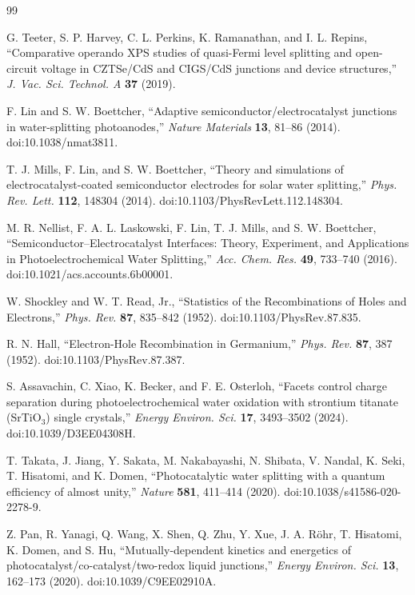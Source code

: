 \documentclass[11pt]{article}
\begin{document}
\clearpage
{}
{}
\begin{thebibliography}{99}

G. Teeter, S. P. Harvey, C. L. Perkins, K. Ramanathan, and I. L. Repins,
``Comparative operando XPS studies of quasi-Fermi level splitting and open-circuit voltage in CZTSe/CdS and CIGS/CdS junctions and device structures,''
\textit{J. Vac. Sci. Technol. A} \textbf{37} (2019).

F. Lin and S. W. Boettcher,
``Adaptive semiconductor/electrocatalyst junctions in water-splitting photoanodes,''
\textit{Nature Materials} \textbf{13}, 81--86 (2014). doi:10.1038/nmat3811.

T. J. Mills, F. Lin, and S. W. Boettcher,
``Theory and simulations of electrocatalyst-coated semiconductor electrodes for solar water splitting,''
\textit{Phys. Rev. Lett.} \textbf{112}, 148304 (2014). doi:10.1103/PhysRevLett.112.148304.

M. R. Nellist, F. A. L. Laskowski, F. Lin, T. J. Mills, and S. W. Boettcher,
``Semiconductor--Electrocatalyst Interfaces: Theory, Experiment, and Applications in Photoelectrochemical Water Splitting,''
\textit{Acc. Chem. Res.} \textbf{49}, 733--740 (2016). doi:10.1021/acs.accounts.6b00001.

W. Shockley and W. T. Read, Jr.,
``Statistics of the Recombinations of Holes and Electrons,''
\textit{Phys. Rev.} \textbf{87}, 835--842 (1952). doi:10.1103/PhysRev.87.835.

R. N. Hall,
``Electron-Hole Recombination in Germanium,''
\textit{Phys. Rev.} \textbf{87}, 387 (1952). doi:10.1103/PhysRev.87.387.

S. Assavachin, C. Xiao, K. Becker, and F. E. Osterloh,
``Facets control charge separation during photoelectrochemical water oxidation with strontium titanate (SrTiO$_3$) single crystals,''
\textit{Energy Environ. Sci.} \textbf{17}, 3493--3502 (2024). doi:10.1039/D3EE04308H.

T. Takata, J. Jiang, Y. Sakata, M. Nakabayashi, N. Shibata, V. Nandal, K. Seki, T. Hisatomi, and K. Domen,
``Photocatalytic water splitting with a quantum efficiency of almost unity,''
\textit{Nature} \textbf{581}, 411--414 (2020). doi:10.1038/s41586-020-2278-9.

Z. Pan, R. Yanagi, Q. Wang, X. Shen, Q. Zhu, Y. Xue, J. A. R\"ohr, T. Hisatomi, K. Domen, and S. Hu,
``Mutually-dependent kinetics and energetics of photocatalyst/co-catalyst/two-redox liquid junctions,''
\textit{Energy Environ. Sci.} \textbf{13}, 162--173 (2020). doi:10.1039/C9EE02910A.


\end{thebibliography}
\end{document}
